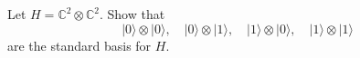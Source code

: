 \documentclass[dvipdfmx,a4paper]{jsarticle}
\theoremstyle{mystyle}
\begin{document}
\newpage

\section*{}

Let $H=\mathbb{C}^2\otimes\mathbb{C}^2$.
Show that
\[
|0\rangle\otimes|0\rangle,\quad
|0\rangle\otimes|1\rangle,\quad
|1\rangle\otimes|0\rangle,\quad
|1\rangle\otimes|1\rangle
\]
are the standard basis for $H$.

\vspace{1em}

\section*{}
\end{document}
